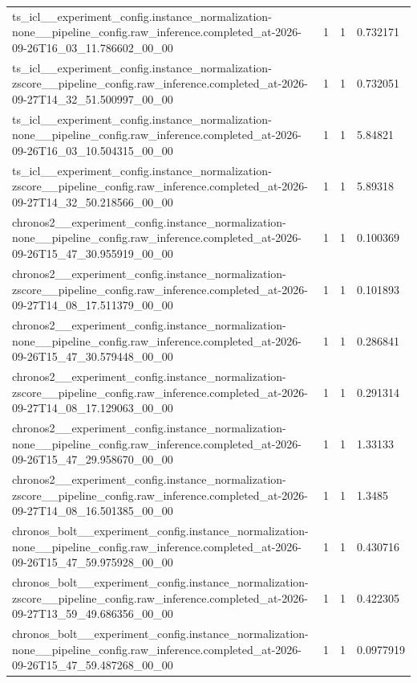 \begin{tabular}{llll}
ts\_icl\_\_experiment\_config.instance\_normalization-none\_\_pipeline\_config.raw\_inference.completed\_at-2026-09-26T16\_03\_11.786602\_00\_00 & 1 & 1 & 0.732171 \\
ts\_icl\_\_experiment\_config.instance\_normalization-zscore\_\_pipeline\_config.raw\_inference.completed\_at-2026-09-27T14\_32\_51.500997\_00\_00 & 1 & 1 & 0.732051 \\
ts\_icl\_\_experiment\_config.instance\_normalization-none\_\_pipeline\_config.raw\_inference.completed\_at-2026-09-26T16\_03\_10.504315\_00\_00 & 1 & 1 & 5.84821 \\
ts\_icl\_\_experiment\_config.instance\_normalization-zscore\_\_pipeline\_config.raw\_inference.completed\_at-2026-09-27T14\_32\_50.218566\_00\_00 & 1 & 1 & 5.89318 \\
chronos2\_\_experiment\_config.instance\_normalization-none\_\_pipeline\_config.raw\_inference.completed\_at-2026-09-26T15\_47\_30.955919\_00\_00 & 1 & 1 & 0.100369 \\
chronos2\_\_experiment\_config.instance\_normalization-zscore\_\_pipeline\_config.raw\_inference.completed\_at-2026-09-27T14\_08\_17.511379\_00\_00 & 1 & 1 & 0.101893 \\
chronos2\_\_experiment\_config.instance\_normalization-none\_\_pipeline\_config.raw\_inference.completed\_at-2026-09-26T15\_47\_30.579448\_00\_00 & 1 & 1 & 0.286841 \\
chronos2\_\_experiment\_config.instance\_normalization-zscore\_\_pipeline\_config.raw\_inference.completed\_at-2026-09-27T14\_08\_17.129063\_00\_00 & 1 & 1 & 0.291314 \\
chronos2\_\_experiment\_config.instance\_normalization-none\_\_pipeline\_config.raw\_inference.completed\_at-2026-09-26T15\_47\_29.958670\_00\_00 & 1 & 1 & 1.33133 \\
chronos2\_\_experiment\_config.instance\_normalization-zscore\_\_pipeline\_config.raw\_inference.completed\_at-2026-09-27T14\_08\_16.501385\_00\_00 & 1 & 1 & 1.3485 \\
chronos\_bolt\_\_experiment\_config.instance\_normalization-none\_\_pipeline\_config.raw\_inference.completed\_at-2026-09-26T15\_47\_59.975928\_00\_00 & 1 & 1 & 0.430716 \\
chronos\_bolt\_\_experiment\_config.instance\_normalization-zscore\_\_pipeline\_config.raw\_inference.completed\_at-2026-09-27T13\_59\_49.686356\_00\_00 & 1 & 1 & 0.422305 \\
chronos\_bolt\_\_experiment\_config.instance\_normalization-none\_\_pipeline\_config.raw\_inference.completed\_at-2026-09-26T15\_47\_59.487268\_00\_00 & 1 & 1 & 0.0977919 \\

\end{tabular}
